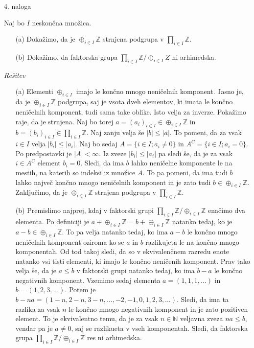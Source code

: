 \documentclass[a4paper, 12pt]{article}
\newcommand{\N}{\mathbb{N}}
\newcommand{\Z}{\mathbb{Z}}
\begin{document}
\begin{flushleft}
4. naloga
\end{flushleft}
Naj bo $I$ neskončna množica.
\begin{enumerate}
\item[(a)] Dokažimo, da je $\oplus_{i\in I} \Z$ strnjena podgrupa v $\prod_{i\in I} \Z$.
\item[(b)] Dokažimo, da faktorska grupa $\prod_{i\in I} \Z / \oplus_{i\in I} Z$ ni arhimedska.
\end{enumerate}
\emph{Rešitev}
\begin{enumerate}
\item[(a)] Elementi $\oplus_{i\in I}$ imajo le končno mnogo neničelnih komponent. Jasno je, da je $\oplus_{i \in I} \Z$ podgrupa, saj je vsota dveh elementov, ki imata le končno neničelnih komponent, tudi sama take oblike. Isto velja za inverze. Pokažimo raje, da je strnjena. Naj bo torej $a = (a_i)_{i\in I}\in \oplus_{i \in I} \Z$ in $b = (b_i)_{i\in I}\in \prod_{i\in I} \Z$. Naj zanju velja še $|b| \le |a|$. To pomeni, da za vsak $i\in I$ velja $|b_i| \le |a_i|$. Naj bo sedaj $A= \{ i \in I; a_i \neq 0\}$ in $A^C = \{i\in I; a_i =0\}$. Po predpostavki je $|A| < \infty$. Iz zveze $|b_i| \le |a_i| $ pa sledi še, da je za vsak $i\in A^C$ element $b_i=0$. Sledi, da ima $b$ lahko neničelne komponente le na mestih, na katerih so indeksi iz množice $A$. To pa pomeni, da ima tudi $b$ lahko največ končno mnogo neničelnih komponent in je zato tudi $b\in \oplus_{i\in I} \Z$. Zaključimo, da je $\oplus_{i\in I}\Z$ strnjena podgrupa v $\prod_{i \in I} \Z$.
\item[(b)] Premislimo najprej, kdaj v faktorski grupi $\prod_{i\in I} \Z/ \oplus_{i\in I} \Z$ enačimo dva elementa. Po definiciji je $a + \oplus_{i\in I} \Z = b + \oplus_{i\in I} \Z $ natanko tedaj, ko je $a-b\in \oplus_{i\in I} \Z$. To pa velja natanko tedaj, ko ima $a-b$ le končno mnogo neničelnih komponent oziroma ko se $a$ in $b$ razlikujeta le na končno mnogo komponentah. Od tod takoj sledi, da so v ekvivalenčnem razredu enote natanko vsi tisti elementi, ki imajo le končno neničenih komponent. Prav tako velja še, da je $a\le b$ v faktorski grupi natanko tedaj, ko ima $b-a$ le končno negativnih komponent. Vzemimo sedaj elementa $a=(1,1,1,\dots)$ in $b=(1,2,3,\dots)$. Potem je $b-na = (1-n,2-n,3-n,\dots, -2,-1,0,1,2,3,\dots)$. Sledi, da ima ta  razlika za vsak $n$ le končno mnogo negativnih komponent in je zato  pozitiven element. To je ekvivalentno temu, da je za vsak $n\in \N$ veljavna zveza $na \le b$, vendar pa je $a\neq 0$, saj se razlikueta v vseh komponentah. Sledi, da faktorska grupa $\prod_{i\in I}\Z/ \oplus_{i\in I} \Z$ res ni arhimedska.
\end{enumerate}
\end{document}
